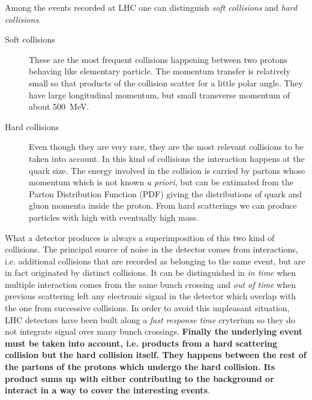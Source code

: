 Among the events recorded at LHC one can distinguish \emph{soft collisions} and \emph{hard collisions}.
\begin{description}
\item[Soft collisions] These are the most frequent collisions happening between two protons behaving like elementary particle. The momentum transfer is relatively small so that products of the collision scatter for a little polar angle. They have large longitudinal \mbox{momentum}, but small transverse momentum \pt of about \SI{500}{\MeV}.
\item[Hard collisions] Even though they are very rare, they are the most relevant collisions to be taken into account. In this kind of collisions the interaction happens at the quark size. The energy involved in the collision is carried by partons whose momentum which is not known \emph{a priori}, but can be extimated from the Parton Distribution Function (PDF) giving the distributions of quark and gluon momenta inside the proton. From hard scatterings we can produce particles with high \pt with eventually high mass.
\end{description}

What a detector produces is always a superimposition of this two kind of collisions. The principal source of noise in the detector comes from \pileup interactions, i.e. additional \pp collisions that are recorded as belonging to the same event, but are in fact originated by distinct collisions. It can be distinguished in \emph{in time \pileup} when multiple interaction comes from the same bunch crossing and \emph{out of time \pileup} when previous scattering left any electronic signal in the detector which overlap with the one from successive collisions. In order to avoid this unpleasant situation, LHC detectors have been built along a \emph{fast response time} cryterium so they do not integrate signal over many bunch crossings. \textbf{Finally the underlying event must be taken into account, i.e. products from a hard scattering collision but the hard collision itself. They happens between the rest of the partons of the protons which undergo the hard collision. Its product sums up with \pileup either contributing to the background or interact in a way to cover the interesting events}.

